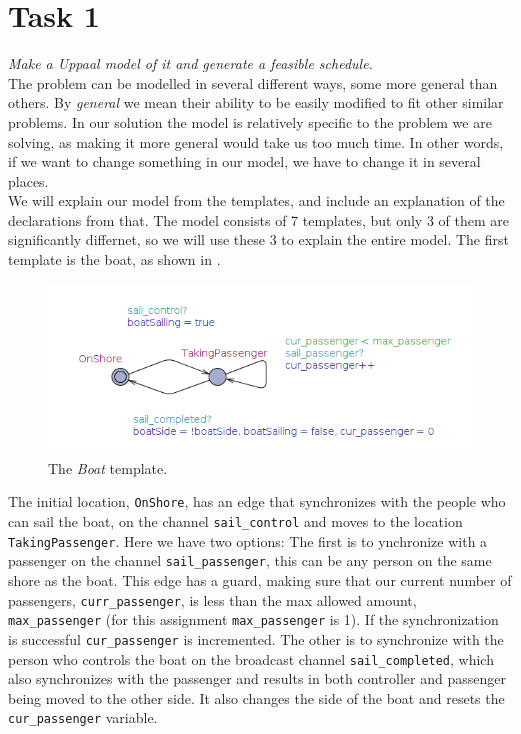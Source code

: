 \section{Task 1}
\label{sec:task1}
\textit{Make a Uppaal model of it and generate a feasible schedule.}\\
The problem can be modelled in several different ways, some more general than others. By \textit{general} we mean their ability to be easily modified to fit other similar problems. In our solution the model is relatively specific to the problem we are solving, as making it more general would take us too much time. In other words, if we want to change something in our model, we have to change it in several places.\\

We will explain our model from the templates, and include an explanation of the declarations from that. The model consists of 7 templates, but only 3 of them are significantly differnet, so we will use these 3 to explain the entire model. The first template is the boat, as shown in .

\begin{figure}[H] \centering
	\includegraphics[width=1\textwidth]{Images/boat.png}
	\caption{The \textit{Boat} template.}\label{fig:boat}
\end{figure} 

The initial location, \texttt{OnShore}, has an edge that synchronizes with the people who can sail the boat, on the channel \texttt{sail_control} and moves to the location \texttt{TakingPassenger}. Here we have two options: The first is to ynchronize with a passenger on the channel \texttt{sail_passenger}, this can be any person on the same shore as the boat. This edge has a guard, making sure that our current number of passengers, \texttt{curr_passenger}, is less than the max allowed amount, \texttt{max_passenger} (for this assignment \texttt{max_passenger} is 1). If the synchronization is successful \texttt{cur_passenger} is incremented. The other is to synchronize with the person who controls the boat on the broadcast channel \texttt{sail_completed}, which also synchronizes with the passenger and results in both controller and passenger being moved to the other side. It also changes the side of the boat and resets the \texttt{cur_passenger} variable.

